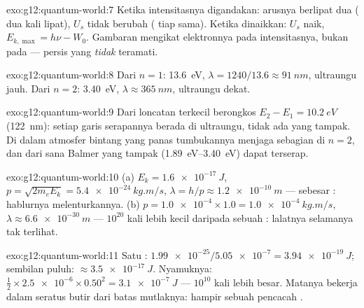 \begin{solution}{exo:g12:quantum-world:7}
Ketika intensitasnya digandakan: arusnya berlipat dua ( dua kali lipat), $U_s$
tidak berubah ( tiap  sama). Ketika  dinaikkan: $U_s$ naik,
$E_{k,\max} = h\nu - W_0$. Gambaran  mengikat  elektronnya
pada intensitasnya, bukan pada  --- persis yang \emph{tidak}
teramati.
\end{solution}

\begin{solution}{exo:g12:quantum-world:8}
Dari $n = 1$: \qty{13.6}{eV}, $\lambda = 1240/13.6 \approx
\qty{91}{nm}$, ultraungu jauh. Dari $n = 2$: \qty{3.40}{eV},
$\lambda \approx \qty{365}{nm}$, ultraungu dekat.
\end{solution}

\begin{solution}{exo:g12:quantum-world:9}
Dari  loncatan terkecil berongkos $E_2 - E_1 =
\qty{10.2}{eV}$ (\qty{122}{nm}): setiap garis serapannya berada di
ultraungu, tidak ada yang tampak. Di dalam atmosfer bintang yang panas tumbukannya menjaga
sebagian  di $n = 2$, dan dari sana  Balmer yang tampak
(\qtyrange{1.89}{3.40}{eV}) dapat terserap.
\end{solution}

\begin{solution}{exo:g12:quantum-world:10}
(a) $E_k = \qty{1.6e-17}{J}$, $p = \sqrt{2m_e E_k} =
\qty{5.4e-24}{kg.m/s}$, $\lambda = h/p \approx \qty{1.2e-10}{m}$ ---
sebesar : hablurnya melenturkannya. (b) $p = \num{1.0e-4} \times 1.0 =
\qty{1.0e-4}{kg.m/s}$, $\lambda \approx \qty{6.6e-30}{m}$ --- $10^{20}$
kali lebih kecil daripada sebuah :  lalatnya selamanya tak terlihat.
\end{solution}

\begin{solution}{exo:g12:quantum-world:11}
Satu : $\num{1.99e-25}/\num{5.05e-7} = \qty{3.94e-19}{J}$; sembilan puluh:
$\approx \qty{3.5e-17}{J}$. Nyamuknya: $\tfrac12 \times \num{2.5e-6}
\times 0.50^2 = \qty{3.1e-7}{J}$ --- $10^{10}$ kali lebih besar. Matanya
bekerja dalam seratus butir dari batas mutlaknya: hampir sebuah pencacah
.
\end{solution}

